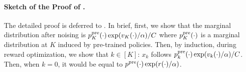 \vspace{-2mm}
\paragraph{Sketch of the Proof of .} The detailed proof is deferred to . In brief, first,
we show that the marginal distribution after noising is $p^{\mathrm{pre}}_K(\cdot)\exp(v_K(\cdot)/\alpha)/C$ where $p^{\mathrm{pre}}_K(\cdot)$ is a marginal distribution at $K$ induced by pre-trained policies. Then, by induction, during reward optimization, we show that $k\in [K]$: $x_k$ follows $p^{\mathrm{pre}}_k(\cdot)\exp(v_k(\cdot)/\alpha)/C$. Then, when $k=0$, it would be equal to $p^{\mathrm{pre}}(\cdot)\exp(r(\cdot)/\alpha)$. 